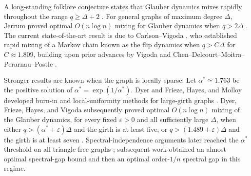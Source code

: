 \documentclass[a4paper,12pt]{article}
\theoremstyle{plain}
\theoremstyle{definition}
\begin{document}



A long-standing folklore conjecture states that
Glauber dynamics mixes rapidly throughout the range $q \geq \Delta + 2$ \cite{Jerrum1995}. For general graphs of maximum degree $\Delta$, Jerrum proved optimal
$O(n\log n)$ mixing for Glauber dynamics when $q>2\Delta$ \cite{Jerrum1995}. The current state-of-the-art result is due to Carlson--Vigoda \cite{CarlsonVigoda2025}, who established rapid mixing of a Markov chain known as the flip dynamics when $q > C\Delta$ for $C \approx 1.809$, building upon prior advances by Vigoda \cite{Vigoda2000} and Chen--Delcourt--Moitra--Perarnau--Postle \cite{ChenEtAl2019}.

Stronger results are known when the graph is locally sparse.  Let
$\alpha^*\simeq1.763$ be the positive solution of
$\alpha^*=\exp(1/\alpha^*)$.  Dyer and Frieze, Hayes, and Molloy developed
burn-in and local-uniformity methods for large-girth graphs
\cite{DyerFrieze2003,Hayes2003,Molloy2004}.  Dyer, Frieze, Hayes, and Vigoda
subsequently proved optimal $O(n\log n)$ mixing of the Glauber dynamics,
for every fixed $\varepsilon>0$ and all sufficiently large $\Delta$, when either
$q>(\alpha^*+\varepsilon)\Delta$ and the girth is at least five, or
$q>(1.489+\varepsilon)\Delta$ and the girth is at least seven
\cite{DFHV2013}.  Spectral-independence arguments later reached the
$\alpha^*$ threshold on all triangle-free graphs
\cite{CGSV2021,FGYZ2022}; subsequent work obtained an almost-optimal
spectral-gap bound \cite{JPV2022} and then an optimal order-$1/n$ spectral
gap \cite{ChenFeng2025} in this regime.
\end{document}
